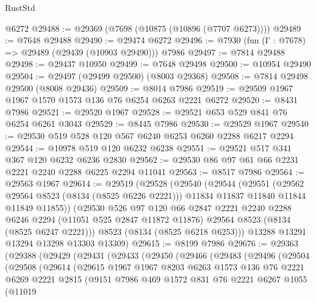 \begin{lexlean}{RustStd}
\begin{coremodule}
{\begin{coremodule}
{{{{{{{{{{{{{{{{{{{{{{{{{{{{{{{{{{{{{{{{{{{{{{{{{{{{{    @6272
@29488 := @29369 (@7698 (@10875 (@10896 (@7707 @6273))))
@29489 := @7648 @29488
@29490 := @29474 @6272
@29496 := @7930 (fun (Γ : @7678) => @29489 (@29439 (@10903 @29490))) @7986
@29497 := @7814 @29488
@29498 := @29437 @10950
@29499 := @7648 @29498
@29500 := @10954 @29490
@29504 := @29497 (@29499 @29500) (@8003 @29368)
@29508 := @7814 @29498 @29500 (@8008 @29436)
@29509 := @8014 @7986
@29519 := @29509 @1967 @1967 @1570 @1573 @136 @76 @6254 @6263 @2221 @6272
@29520 := @8431 @7986
@29521 := @29520 @1967
@29528 := @29521 @653 @529 @841 @76 @6254 @6261 @3043
@29529 := @8445 @7986
@29530 := @29529 @1967
@29540 := @29530 @519 @528 @120 @567 @6240 @6253 @6260 @2288 @6217 @2294
@29544 := @10978 @519 @120 @6232 @6238
@29551 := @29521 @517 @341 @367 @120 @6232 @6236 @2830
@29562 := @29530 @86 @97 @61 @66 @2231 @2221 @2240 @2288 @6225 @2294 @11041
@29563 := @8517 @7986
@29564 := @29563 @1967
@29614 := @29519
    (@29528
      (@29540
        (@29544
          (@29551
            (@29562 @29564 @8523 (@8134 (@8525 @6226 @2221)))
            @11834
            @11837
            @11840
            @11844
            @11849
            @11855))
        (@29530
          @526
          @97
          @120
          @66
          @2847
          @2221
          @2240
          @2288
          @6246
          @2294
          (@11051 @525 @2847 @11872 @11876)
          @29564
          @8523
          (@8134 (@8525 @6247 @2221)))
        @8523
        (@8134 (@8525 @6218 @6253)))
      @13288
      @13291
      @13294
      @13298
      @13303
      @13309)
@29615 := @8199 @7986
@29676 := @29363
    (@29388
      (@29429
        (@29431
          (@29433
            (@29450
              (@29466
                (@29483
                  (@29496
                    (@29504
                      (@29508
                        (@29614
                          (@29615
                            @1967
                            @1967
                            @8203
                            @6263
                            @1573
                            @136
                            @76
                            @2221
                            @6269
                            @2221
                            @2815
                            (@9151
                              @7986
                              @469
                              @1572
                              @831
                              @76
                              @2221
                              @6267
                              @1055
                              (@11019
}}}}}}}}}}}}}}}}}}}}}}}}}}}}}}}}}}}}}}}}}}}}}}}}}}}}}
\end{coremodule}}
\end{coremodule}
\end{lexlean}
